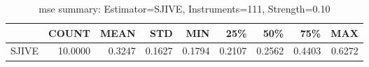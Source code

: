 \begin{table}[ht]
\centering
\caption{mse summary: Estimator=SJIVE, Instruments=111, Strength=0.10}
\begin{tabular}{lrrrrrrrr}
\toprule
 & COUNT & MEAN & STD & MIN & 25\% & 50\% & 75\% & MAX \\
\midrule
SJIVE & 10.0000 & 0.3247 & 0.1627 & 0.1794 & 0.2107 & 0.2562 & 0.4403 & 0.6272 \\
\bottomrule
\end{tabular}
\end{table}
